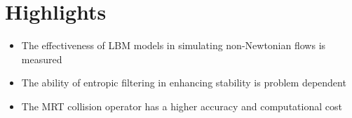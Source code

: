 \documentclass{article}
\begin{document}
\section*{Highlights}

\begin{itemize}
	\item The effectiveness of LBM models in simulating non-Newtonian flows is measured
	\item The ability of entropic filtering in enhancing stability is problem dependent
	\item The MRT collision operator has a higher accuracy and computational cost
\end{itemize}
	
\end{document}

